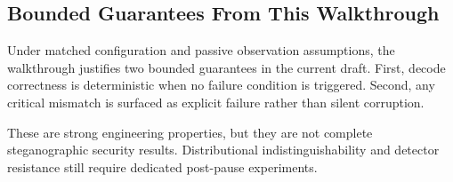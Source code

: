 \subsection{Bounded Guarantees From This Walkthrough}

Under matched configuration and passive observation assumptions, the walkthrough justifies two bounded guarantees in the current draft. First, decode correctness is deterministic when no failure condition is triggered. Second, any critical mismatch is surfaced as explicit failure rather than silent corruption.

These are strong engineering properties, but they are not complete steganographic security results. Distributional indistinguishability and detector resistance still require dedicated post-pause experiments.
